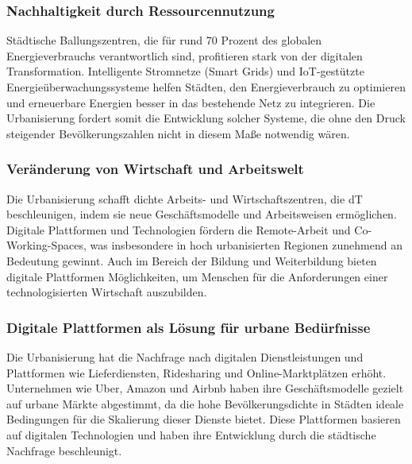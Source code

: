 \documentclass[conference,compsoc,final,a4paper, onecolumn, 11pt]{IEEEtran}
\begin{document}
\subsubsection{Nachhaltigkeit durch Ressourcennutzung}
Städtische Ballungszentren, die für rund 70 Prozent des globalen Energieverbrauchs verantwortlich sind, profitieren stark von der digitalen Transformation. 
Intelligente Stromnetze (Smart Grids) und \ac{IoT}-gestützte Energieüberwachungssysteme helfen Städten, den Energieverbrauch zu optimieren und erneuerbare Energien besser in das bestehende Netz zu integrieren.
Die Urbanisierung fordert somit die Entwicklung solcher Systeme, die ohne den Druck steigender Bevölkerungszahlen nicht in diesem Maße notwendig wären. \autocite{sensors_smart_2015}
 

\subsubsection{Veränderung von Wirtschaft und Arbeitswelt}
Die Urbanisierung schafft dichte Arbeits- und Wirtschaftszentren, die \ac{dT} beschleunigen, indem sie neue Geschäftsmodelle und Arbeitsweisen ermöglichen.
Digitale Plattformen und Technologien fördern die Remote-Arbeit und Co-Working-Spaces, was insbesondere in hoch urbanisierten Regionen zunehmend an Bedeutung gewinnt.
Auch im Bereich der Bildung und Weiterbildung bieten digitale Plattformen Möglichkeiten, um Menschen für die Anforderungen einer technologisierten Wirtschaft auszubilden. \autocite{digital_how_2024}


\subsubsection{Digitale Plattformen als Lösung für urbane Bedürfnisse}
Die Urbanisierung hat die Nachfrage nach digitalen Dienstleistungen und Plattformen wie Lieferdiensten, Ridesharing und Online-Marktplätzen erhöht. 
Unternehmen wie Uber, Amazon und Airbnb haben ihre Geschäftsmodelle gezielt auf urbane Märkte abgestimmt, da die hohe Bevölkerungsdichte in Städten ideale Bedingungen für die Skalierung dieser Dienste bietet. 
Diese Plattformen basieren auf digitalen Technologien und haben ihre Entwicklung durch die städtische Nachfrage beschleunigt. \autocite{sustainability_digital_2023}
\end{document}
